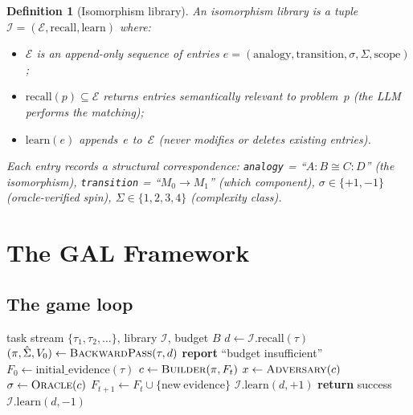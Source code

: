 \documentclass{article}
\newtheorem{definition}[theorem]{Definition}
\newcommand{\calE}{\mathcal{E}}
\newcommand{\calI}{\mathcal{I}}
\begin{document}
\begin{definition}[Isomorphism library]\label{def:library}
An \emph{isomorphism library} is a tuple
$\calI = (\calE, \mathrm{recall}, \mathrm{learn})$ where:
\begin{itemize}[nosep]
  \item $\calE$ is an append-only sequence of entries
    $e = (\mathrm{analogy}, \mathrm{transition}, \sigma,
    \Sigma, \mathrm{scope})$;
  \item $\mathrm{recall}(p) \subseteq \calE$ returns entries
    semantically relevant to problem~$p$ (the LLM performs the
    matching);
  \item $\mathrm{learn}(e)$ appends~$e$ to~$\calE$ (never
    modifies or deletes existing entries).
\end{itemize}
Each entry records a structural correspondence:
\texttt{analogy} = ``$A\!:\!B \cong C\!:\!D$'' (the isomorphism),
\texttt{transition} = ``$M_0 \to M_1$'' (which component),
$\sigma \in \{+1, -1\}$ (oracle-verified spin),
$\Sigma \in \{1,2,3,4\}$ (complexity class).
\end{definition}

\section{The GAL Framework}\label{sec:framework}

\subsection{The game loop}

\begin{algorithm}[t]
\caption{GAL: Generative Adversarial Library}\label{alg:gal}
\begin{algorithmic}[1]
\REQUIRE task stream $\{\tau_1, \tau_2, \ldots\}$, library
  $\calI$, budget $B$
  \STATE $d \gets \calI.\mathrm{recall}(\tau)$
    \hfill{}
  \STATE $(\pi, \hat\Sigma, V_0) \gets
    \textsc{BackwardPass}(\tau, d)$
    \hfill{}
    \STATE \textbf{report} ``budget insufficient''
    \hfill{}
  \ENDIF
  \STATE $F_0 \gets \mathrm{initial\_evidence}(\tau)$
    \STATE $c \gets \textsc{Builder}(\pi, F_t)$
      \hfill{}
    \STATE $x \gets \textsc{Adversary}(c)$
      \hfill{}
    \STATE $\sigma \gets \textsc{Oracle}(c)$
      \hfill{}
    \STATE $F_{t+1} \gets F_t \cup \{\mathrm{new\ evidence}\}$
      \STATE $\calI.\mathrm{learn}(d, +1)$
        \hfill{}
      \STATE \textbf{return} success
    \ELSE
      \STATE $\calI.\mathrm{learn}(d, -1)$
        \hfill{}
    \ENDIF
  \ENDWHILE
\ENDFOR
\end{algorithmic}
\end{algorithm}
\end{document}
